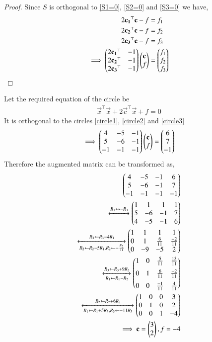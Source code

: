 \documentclass[journal,12pt,twocolumn]{IEEEtran}
\begin{document}
\begin{proof}
Since $S$ is orthogonal to \eqref{S1=0}, \eqref{S2=0} and \eqref{S3=0} we have,
\begin{align}
    2\mathbf{c_1}^\top\mathbf{c} - f &= f_1\\
    2\mathbf{c_2}^\top\mathbf{c} - f &=  f_2\\
    2\mathbf{c_3}^\top\mathbf{c} - f &= f_3\\
    \implies \begin{pmatrix}2\mathbf{c_1}^\top&-1\\2\mathbf{c_2}^\top&-1\\2\mathbf{c_3}^\top&-1\end{pmatrix}\begin{pmatrix}\mathbf{c}\\f\end{pmatrix} &= \begin{pmatrix}f_1\\f_2\\f_3\end{pmatrix}\\
\end{align}
\end{proof}
Let the required equation of the circle be
\begin{align}
    \vec{x}^\top\vec{x} + 2\vec{c}^\top\vec{x} + f = 0
\end{align}
It is orthogonal to the circles \eqref{circle1}, \eqref{circle2} and \eqref{circle3}
\begin{align}
    \implies \begin{pmatrix}4&-5&-1\\5&-6&-1\\-1&-1&-1\end{pmatrix}\begin{pmatrix}\mathbf{c}\\f\end{pmatrix} = \begin{pmatrix}6\\7\\-1\end{pmatrix}
\end{align}
Therefore the augmented matrix can be transformed as,
 \begin{align}
		\begin{pmatrix}4 & -5 & -1 & 6\\
		       5 & -6 & -1 & 7\\
		       -1 & -1 & -1 &-1\end{pmatrix}\\
		\xleftrightarrow[]{R_1\leftrightarrow-R_3 }
		\begin{pmatrix}1 & 1 & 1 & 1\\
		       5 & -6 & -1 & 7\\
		       4 & -5 & -1 & 6\end{pmatrix}\\
		\xleftrightarrow[R_2 \leftarrow R_2-5R_1, R_2 \leftarrow -\frac{R_2}{11}]{R_3 \leftarrow R_3-4R_1}
		\begin{pmatrix}1 & 1 & 1 & 1\\
		       0 & 1 & \frac{6}{11} & \frac{-2}{11}\\
		       0 & -9 & -5 &2\end{pmatrix}\\
		\xleftrightarrow[R_1 \leftarrow R_1-R_2]{R_3 \leftarrow R_3+9R_2}
		\begin{pmatrix}1 & 0 & \frac{5}{11} & \frac{13}{11}\\[0.2cm]
		       0 & 1 & \frac{6}{11} & \frac{-2}{11}\\[0.2cm]
		       0 & 0 & \frac{-1}{11} & \frac{4}{11}\end{pmatrix}\\
		\xleftrightarrow[R_1 \leftarrow R_1+5R_3, R_3 \leftarrow -11R_3]{R_2 \leftarrow R_2+6R_3}
		\begin{pmatrix}1 & 0 & 0 & 3\\ 
		       0 & 1 & 0 & 2\\
		       0 & 0 & 1 &-4\end{pmatrix}\\
    \implies \mathbf{c} = \begin{pmatrix}3\\2\end{pmatrix}, f = -4 		       
\end{align}
\end{document}
